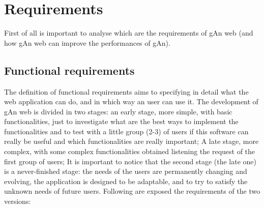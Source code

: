 
\chapter{Requirements} %

\label{Chapter2} %


First of all is important to analyse which are the requirements of gAn web (and how gAn web can improve the performances of gAn). 

\section{Functional requirements}
The definition of functional requirements aims to specifying in detail what the web application can do, and in which way an user can use it. The development of gAn web is divided in two stages: 
an early stage, more simple, with basic functionalities, just to investigate what are the best ways to implement the functionalities and to test with a little group (2-3) of users if this software can really be useful and which functionalities are really important;
A late stage, more complex, with some complex functionalities obtained listening the request of the first group of users;
It is important to notice that the second stage (the late one) is a never-finished stage: the needs of the users are permanently changing and evolving, the application is designed to be adaptable, and to try to satisfy the unknown needs of future users.   
Following are exposed the requirements of the two versions:

